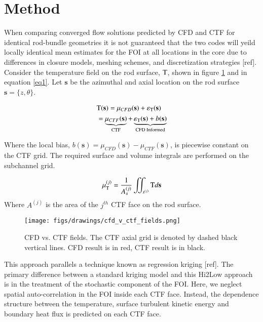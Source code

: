 \documentclass{anstrans}
\begin{document}
\section{Method} 
When comparing converged flow solutions predicted by CFD and CTF for identical rod-bundle geometries it is
not guaranteed that the two codes will yeild locally identical mean estimates for the FOI at all locations in the core due to differences in closure models, meshing schemes, and discretization strategies [ref].  Consider the temperature field on the rod surface, $\text T$, shown in figure \ref{fig:cfd_v_ctf} and in equation \ref{eq1}.  Let $\mathbf s$ be the azimuthal and axial location on the rod surface $\mathbf s = \{z, \theta\}$.

\begin{eqnarray}
&\text T(\mathbf s) = \mu_{CFD}(\mathbf s) + \varepsilon_{\text T}({\mathbf s}) \\ \nonumber
&= \underbrace{\mu_{CTF}(\mathbf{s})}_\text{CTF} + \underbrace{\varepsilon_{\text T}(\mathbf s)+ b(\mathbf{s})}_\text{CFD Informed} 
\label{eq1}
\end{eqnarray}

Where the local bias, $b(\mathbf s) = \mu_{CFD}(\mathbf s) - \mu_{CTF}(\mathbf s)$, is piecewise constant on the CTF grid.  The required surface and volume integrals are performed on the subchannel grid.  

\begin{equation}
\mu_{\text T}^{(j)} = \frac{1}{A_s^{(j)}} \iint_{s^{(j)}} \text T d\mathbf s
\end{equation}  Where $A^{(j)}$ is the area of the $j^{th}$ CTF face on the rod surface.

\begin{figure}[h]
  \texttt{[image: figs/drawings/cfd\_v\_ctf\_fields.png]}
  \caption{    CFD vs. CTF fields.  The CTF axial grid is denoted by dashed black vertical lines.  CFD result is in red, CTF result is in black.}
  \label{fig:cfd_v_ctf}
\end{figure}

This approach parallels a technique known as regression kriging [ref].  The primary difference between a standard kriging model and this Hi2Low approach is in the treatment of the stochastic component of the FOI.  Here, we neglect spatial auto-correlation in the FOI inside each CTF face.  Instead, the dependence structure between the temperature, surface turbulent kinetic energy and boundary heat flux is predicted on each CTF face.   
\end{document}
